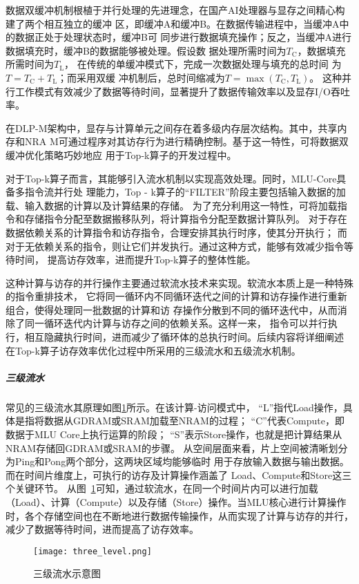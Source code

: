 数据双缓冲机制根植于并行处理的先进理念，在国产AI处理器与显存之间精心构建了两个相互独立的缓冲
区，即缓冲A和缓冲B。在数据传输进程中，当缓冲A中的数据正处于处理状态时，缓冲B可
同步进行数据填充操作；反之，当缓冲A进行数据填充时，缓冲B的数据能够被处理。假设数
据处理所需时间为\(T_{\text{C}}\)，数据填充所需时间为\(T_{\text{L}}\)，
在传统的单缓冲模式下，完成一次数据处理与填充的总时间
为\(T = T_{\text{C}} + T_{\text{L}}\)；而采用双缓
冲机制后，总时间缩减为\(T=\max(T_{\text{C}}, T_{\text{L}})\)。
这种并行工作模式有效减少了数据等待时间，显著提升了数据传输效率以及显存I/O吞吐率。


在DLP-M架构中，显存与计算单元之间存在着多级内存层次结构。其中，共享内存和NRA
M可通过程序对其访存行为进行精确控制。基于这一特性，可将数据双缓冲优化策略巧妙地应
用于Top-k算子的开发过程中。

对于Top-k算子而言，其能够引入流水机制以实现高效处理。同时，MLU-Core具备多指令流并行处
理能力，Top - k算子的“FILTER”阶段主要包括输入数据的加载、输入数据的计算以及计算结果的存储。
为了充分利用这一特性，可将加载指令和存储指令分配至数据搬移队列，将计算指令分配至数据计算队列。
对于存在数据依赖关系的计算指令和访存指令，合理安排其执行时序，使其分开执行；
而对于无依赖关系的指令，则让它们并发执行。通过这种方式，能够有效减少指令等待时间，
提高访存效率，进而提升Top-k算子的整体性能。

这种计算与访存的并行操作主要通过软流水技术来实现。软流水本质上是一种特殊的指令重排技术，
它将同一循环内不同循环迭代之间的计算和访存操作进行重新组合，使得处理同一批数据的计算和访
存操作分散到不同的循环迭代中，从而消除了同一循环迭代内计算与访存之间的依赖关系。这样一来，
指令可以并行执行，相互隐藏执行时间，进而减少了循环体的总执行时间。后续内容将详细阐述
在Top-k算子访存效率优化过程中所采用的三级流水和五级流水机制。 


\subparagraph{三级流水}
常见的三级流水其原理如图\ref{fig:three_level}所示。在该计算-访问模式中，
“L”指代Load操作，具体是指将数据从GDRAM或SRAM加载至NRAM的过程；
“C”代表Compute，即数据于MLU Core上执行运算的阶段；
“S”表示Store操作，也就是把计算结果从NRAM存储回GDRAM或SRAM的步骤。
从空间层面来看，片上空间被清晰划分为Ping和Pong两个部分，这两块区域均能够临时
用于存放输入数据与输出数据。而在时间片维度上，可执行的访存及计算操作涵盖了
Load、Compute和Store这三个关键环节。 从图~\ref{fig:three_level}可知，通过软流水，在同一个时间片内可以进行加载（Load）、计算（Compute）以及存储（Store）操作。当MLU核心进行计算操作时，各个存储空间也在不断地进行数据传输操作，从而实现了计算与访存的并行，减少了数据等待时间，进而提高了访存效率。
\begin{figure}[ht]
    \centering
    \texttt{[image: three\_level.png]}
    \caption{三级流水示意图}
    \label{fig:three_level}
\end{figure}


